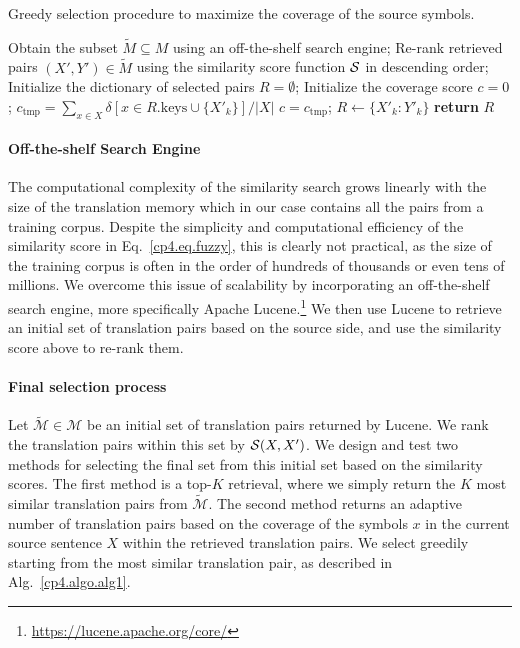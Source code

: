 \begin{algorithm}[htpb]
\caption{Greedy selection procedure to maximize the coverage of the source symbols.} %
\label{cp4.algo.alg1}
\begin{algorithmic}[1]
\small
{}
\State Obtain the subset $\tilde{M}\subseteq M$ using an off-the-shelf search engine;
\State Re-rank retrieved pairs $\left(X', Y' \right) \in \tilde{M}$ using the similarity score function $\mathcal{S}$ in descending order;
\State Initialize the dictionary of selected pairs $R = \emptyset$; 
\State Initialize the coverage score $c=0$;
\State $c_{\text{tmp}}= \sum_{x \in X}\delta\left[ x \in R.\text{keys} \cup \{X'_k\}\right]/|X|$
\State $c = c_{\text{tmp}}$; $R \leftarrow \{X'_k: Y'_k\}$
\EndIf
\EndFor
\State \textbf{return} $R$
\end{algorithmic}
\end{algorithm}


\paragraph{Off-the-shelf Search Engine}

The computational complexity of the similarity search grows linearly with the size of the translation memory which in our case contains all the pairs from a training corpus. Despite the simplicity and computational efficiency of the similarity score in Eq.~\eqref{cp4.eq.fuzzy}, this is clearly not practical, as the size of the training corpus is often in the order of hundreds of thousands or even tens of millions. We overcome this issue of scalability by incorporating an off-the-shelf search engine, more specifically Apache Lucene.\footnote{
\url{https://lucene.apache.org/core/}
} 
We then use Lucene to retrieve an initial set of translation pairs based on the source side, and use the similarity score above to re-rank them. 


\paragraph{Final selection process}
Let $\tilde{\mathcal{M}} \in \mathcal{M}$ be an initial set of translation pairs returned by Lucene. We rank the translation pairs within this set by $\mathcal{S}(X, X')$. We design and test two methods for selecting the final set from this initial set based on the similarity scores. The first method is a top-$K$ retrieval, where we simply return the $K$ most similar translation pairs from $\tilde{\mathcal{M}}$. The second method returns an adaptive number of translation pairs based on the coverage of the symbols $x$ in the current source sentence $X$ within the retrieved translation pairs. We select greedily starting from the most similar translation pair, as described in Alg.~\ref{cp4.algo.alg1}. 


